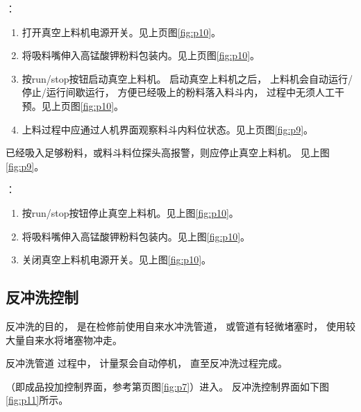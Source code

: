 \documentclass[UTF8,a4paper,12pt,titlepage]{ctexart}
\begin{document}
         ：
         \begin{enumerate}
            \item 打开真空上料机电源开关。见上页图\ref{fig:p10}。
            \item 将吸料嘴伸入高锰酸钾粉料包装内。见上页图\ref{fig:p10}。
            \item 按run/stop按钮启动真空上料机。
            启动真空上料机之后，
            上料机会自动运行/停止/运行间歇运行，
            方便已经吸上的粉料落入料斗内，
            过程中无须人工干预。见上页图\ref{fig:p10}。
            \item 上料过程中应通过人机界面观察料斗内料位状态。见上页图\ref{fig:p9}。
         \end{enumerate}

            已经吸入足够粉料，或料斗料位探头高报警，则应停止真空上料机。
            见上图\ref{fig:p9}。

         ：
         \begin{enumerate}
            \item 按run/stop按钮停止真空上料机。见上图\ref{fig:p10}。
            \item 将吸料嘴伸入高锰酸钾粉料包装内。见上图\ref{fig:p10}。
            \item 关闭真空上料机电源开关。见上图\ref{fig:p10}。
         \end{enumerate}

         \subsection{反冲洗控制}\label{pipe-wash}
        反冲洗的目的，
        是在检修前使用自来水冲洗管道，
        或管道有轻微堵塞时，
        使用较大量自来水将堵塞物冲走。

         反冲洗管道 过程中，
        计量泵会自动停机，
        直至反冲洗过程完成。

       （即成品投加控制界面，参考第\pageref{fig:p7}页图\ref{fig:p7}）进入。
       反冲洗控制界面如下图\ref{fig:p11}所示。
\end{document}
